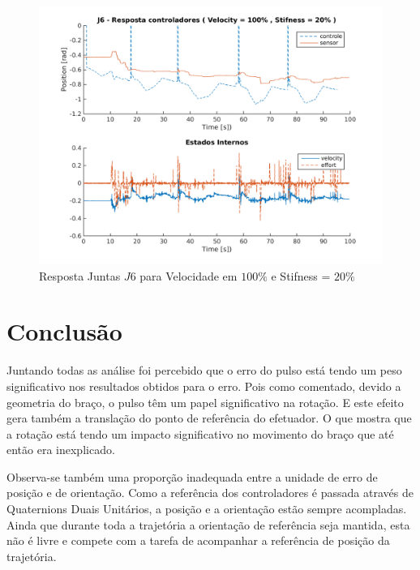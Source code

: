 \vspace{1cm}

\begin{figure}[H]
    \centering
    \includegraphics[width=0.6\linewidth,trim={2cm 1cm 2cm 2cm}]{tex/figs/squareStiffJ7stateEval_J6v100s20.png}
    \caption{Resposta Juntas $J6$ para Velocidade em $100\%$ e Stifness = $20\%$ }
    \label{fig:squareStiffJ7stateEval_J6v100s20}
\end{figure}

\section{Conclusão}

Juntando todas as análise foi percebido que o erro do pulso está tendo um peso significativo nos resultados obtidos para o erro. Pois como comentado, devido a geometria do braço, o pulso têm um papel significativo na rotação. E este efeito gera também a translação do ponto de referência do efetuador. O que mostra que a rotação está tendo um impacto significativo no movimento do braço que até então era inexplicado.

Observa-se também uma proporção inadequada entre a unidade de erro de posição e de orientação. Como a referência dos controladores é passada através de Quaternions Duais Unitários, a posição e a orientação estão sempre acompladas. Ainda que durante toda a trajetória a orientação de referência seja mantida, esta não é livre e compete com a tarefa de acompanhar a referência de posição da trajetória.


